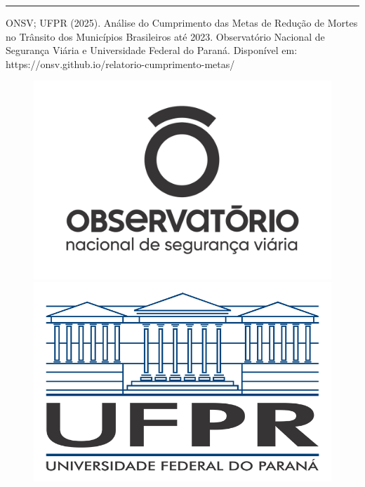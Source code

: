 \documentclass[
  letterpaper,
  DIV=11,
  numbers=noendperiod]{scrreprt}
\begin{document}
\begin{center}\rule{0.5\linewidth}{0.5pt}\end{center}

ONSV; UFPR (2025). Análise do Cumprimento das Metas de Redução de Mortes
no Trânsito dos Municípios Brasileiros até 2023. Observatório Nacional
de Segurança Viária e Universidade Federal do Paraná. Disponível em:
https://onsv.github.io/relatorio-cumprimento-metas/

\begin{figure}

\begin{minipage}{0.36\linewidth}
\begin{center}
\includegraphics{img/onsv-logo.jpg}
\end{center}
\end{minipage}%
%
\begin{minipage}{0.27\linewidth}
\begin{center}
\includegraphics{img/marca_UFPR.png}
\end{center}
\end{minipage}%

\end{figure}%
\end{document}
